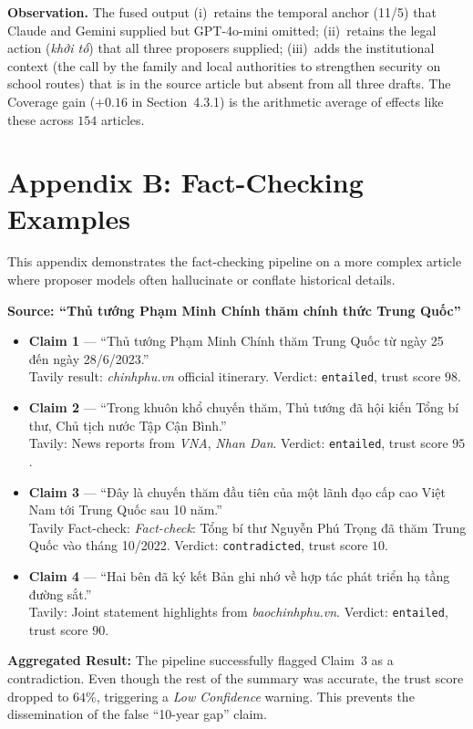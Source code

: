 \textbf{Observation.} The fused output (i)~retains the temporal anchor
(11/5) that Claude and Gemini supplied but GPT-4o-mini omitted;
(ii)~retains the legal action (\textit{khởi tố}) that all three
proposers supplied; (iii)~adds the institutional context (the call by
the family and local authorities to strengthen security on school
routes) that is in the source article but absent from all three
drafts. The Coverage gain ($+0.16$ in Section~4.3.1) is the
arithmetic average of effects like these across $154$ articles.

\section*{Appendix B: Fact-Checking Examples}

This appendix demonstrates the fact-checking pipeline on a more complex
article where proposer models often hallucinate or conflate historical
details.

\textbf{Source: ``Thủ tướng Phạm Minh Chính thăm chính thức Trung Quốc''}

\begin{itemize}
  \item \textbf{Claim 1} --- ``Thủ tướng Phạm Minh Chính thăm Trung Quốc từ ngày 25 đến ngày 28/6/2023.''
        \\Tavily result: \textit{chinhphu.vn} official itinerary. Verdict: \texttt{entailed}, trust score $98$.
  \item \textbf{Claim 2} --- ``Trong khuôn khổ chuyến thăm, Thủ tướng đã hội kiến Tổng bí thư, Chủ tịch nước Tập Cận Bình.''
        \\Tavily: News reports from \textit{VNA}, \textit{Nhan Dan}. Verdict: \texttt{entailed}, trust score $95$.
  \item \textbf{Claim 3} --- ``Đây là chuyến thăm đầu tiên của một lãnh đạo cấp cao Việt Nam tới Trung Quốc sau 10 năm.''
        \\Tavily Fact-check: \textit{Fact-check}: Tổng bí thư Nguyễn Phú Trọng đã thăm Trung Quốc vào tháng 10/2022. Verdict: \texttt{contradicted}, trust score $10$.
  \item \textbf{Claim 4} --- ``Hai bên đã ký kết Bản ghi nhớ về hợp tác phát triển hạ tầng đường sắt.''
        \\Tavily: Joint statement highlights from \textit{baochinhphu.vn}. Verdict: \texttt{entailed}, trust score $90$.
\end{itemize}

\noindent \textbf{Aggregated Result:} The pipeline successfully flagged Claim~3 as a contradiction. Even though the rest of the summary was accurate, the trust score dropped to $64\%$, triggering a \textit{Low Confidence} warning. This prevents the dissemination of the false ``10-year gap'' claim.

